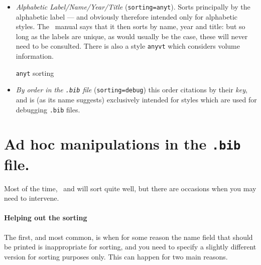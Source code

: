 \begin{itemize}
\begin{marginfigure}[1ex]
\caption{\texttt{ynt} sorting}
\end{marginfigure}
\item
  \emph{Alphabetic Label/Name/Year/Title} (\texttt{sorting=anyt}). Sorts
  principally by the alphabetic label --- and obviously therefore
  intended only for alphabetic styles. The \biblatex~manual says that it
  then sorts by name, year and title: but so long as the labels are
  unique, as would usually be the case, these will never need to be
  consulted. There is also a style \texttt{anyvt} which
  considers volume information.
 \begin{marginfigure}[1ex]
\vspace{3pt}
  \caption{\texttt{anyt} sorting}
  \end{marginfigure}
\item \emph{By order in the \texttt{.bib} file}
  (\texttt{sorting=debug}) this order citations by their \emph{key},
  and is (as its name suggests) exclusively intended for styles which
  are used for debugging \texttt{.bib} files.
\end{itemize}

\section{Ad hoc manipulations in the \texttt{.bib} file.}

Most of the time, \biblatex\ and  will sort quite well,
but there are occasions when you may need to intervene.

\paragraph{Helping out the sorting}\label{sorting:sortname} The first,
and most common, is when for some reason the name field that should be
printed is inappropriate for sorting, and you need to specify a
slightly different version for sorting purposes only. This can happen
for two main reasons.

